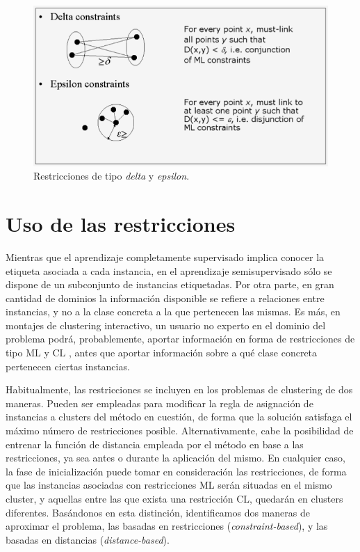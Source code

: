 \begin{figure}[!h]
	\centering
	\includegraphics[scale=0.45]{imagenes/c3/RestriccionesDeltaEpsilo.png} 
	\caption[Restricciones de tipo delta y epsilon.]{Restricciones de tipo \textit{delta} y \textit{epsilon}. \cite{Survey:2007}}\label{fig:figure4}
\end{figure}


\section{Uso de las restricciones}

Mientras que el aprendizaje completamente supervisado implica conocer la etiqueta asociada a cada instancia, en el aprendizaje semisupervisado sólo se dispone de un subconjunto de instancias etiquetadas. Por otra parte, en gran cantidad de dominios la información disponible se refiere a relaciones entre instancias, y no a la clase concreta a la que pertenecen las mismas. Es más, en montajes de clustering interactivo, un usuario no experto en el dominio del problema podrá, probablemente, aportar información en forma de restricciones de tipo \acf{ML} y \acf{CL} \cite{Cohn:2003}\cite{DavidsonRavi:2007}, antes que aportar información sobre a qué clase concreta pertenecen ciertas instancias.

Habitualmente, las restricciones se incluyen en los problemas de clustering de dos maneras. Pueden ser empleadas para modificar la regla de asignación de instancias a clusters del método en cuestión, de forma que la solución satisfaga el máximo número de restricciones posible. Alternativamente, cabe la posibilidad de entrenar la función de distancia empleada por el método en base a las restricciones, ya sea antes o durante la aplicación del mismo. En cualquier caso, la fase de inicialización puede tomar en consideración las restricciones, de forma que las instancias asociadas con restricciones \acf{ML} serán situadas en el mismo cluster, y aquellas entre las que exista una restricción \acf{CL}, quedarán en clusters diferentes. Basándonos en esta distinción, identificamos dos maneras de aproximar el problema, las basadas en restricciones (\textit{constraint-based}), y las basadas en distancias (\textit{distance-based}).

